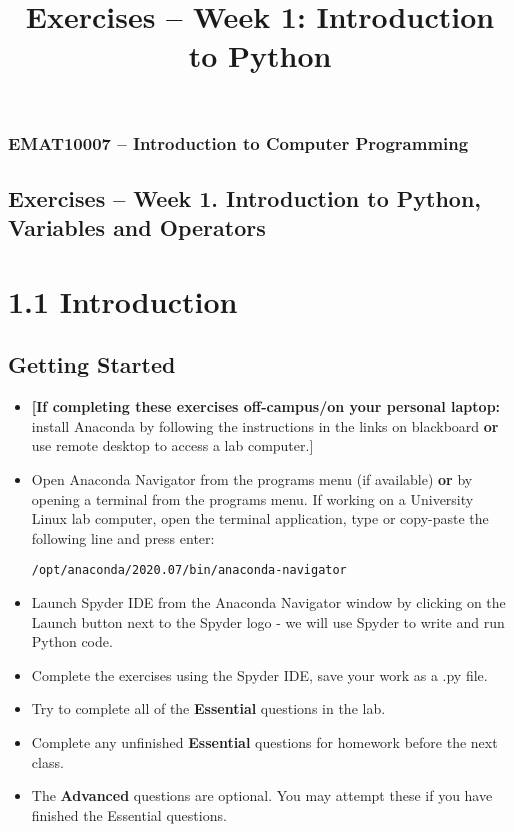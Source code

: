 \documentclass[12pt]{article}
\begin{document}
\title{Exercises -- Week 1: Introduction to Python}
\subsubsection*{EMAT10007 -- Introduction to Computer Programming}
\subsection*{\Large Exercises -- Week 1. Introduction to Python, Variables and Operators}

\section*{1.1 Introduction}

\subsection*{Getting Started}

\begin{itemize}
    \item{{\bf [If completing these exercises off-campus/on your personal laptop:} install Anaconda by following the instructions in the links on blackboard {\bf or} use remote desktop to access a lab computer.]} 
    \item{Open Anaconda Navigator from the programs menu (if available) {\bf or} by opening a terminal from the programs menu. If working on a University Linux lab computer, open the terminal application, type or copy-paste the following line and press enter:}
    
    \vspace{0.5em}
		{\tt /opt/anaconda/2020.07/bin/anaconda-navigator}
	\vspace{0.5em}
    
    \item{Launch Spyder IDE from the Anaconda Navigator window by clicking on the Launch button next to the Spyder logo - we will use Spyder to write and run Python code.}
    \item{Complete the exercises using the Spyder IDE, save your work as a .py file.}
    \item{Try to complete all of the {\bf Essential} questions in the lab.}
    \item{Complete any unfinished {\bf Essential} questions for homework before the next class.}
    \item{The {\bf Advanced} questions are optional. You may attempt these if you have finished the Essential questions.}
\end{itemize}
\end{document}
